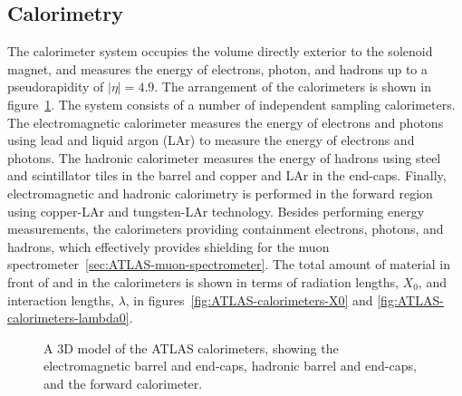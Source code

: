 \subsection{Calorimetry}\label{sec:ATLAS-calorimeters}
The calorimeter system occupies the volume directly exterior to the solenoid magnet, and measures the energy of electrons, photon, and hadrons up to a pseudorapidity of $|\eta|=4.9$. The arrangement of the calorimeters is shown in figure~\ref{fig:ATLAS-calorimeters}. The system consists of a number of independent sampling calorimeters. The electromagnetic calorimeter measures the energy of electrons and photons using lead and liquid argon (LAr) to measure the energy of electrons and photons. The hadronic calorimeter measures the energy of hadrons using steel and scintillator tiles in the barrel and copper and LAr in the end-caps. Finally, electromagnetic and hadronic calorimetry is performed in the forward region using copper-LAr and tungsten-LAr technology. Besides performing energy measurements, the calorimeters providing containment electrons, photons, and hadrons, which effectively provides shielding for the muon spectrometer~\ref{sec:ATLAS-muon-spectrometer}. The total amount of material in front of and in the calorimeters is shown in terms of radiation lengths, $X_0$, and interaction lengths, $\lambda$, in figures~\ref{fig:ATLAS-calorimeters-X0} and \ref{fig:ATLAS-calorimeters-lambda0}.

\begin{figure}[htbp]
	\centering
	\caption{A 3D model of the ATLAS calorimeters, showing the electromagnetic barrel and end-caps, hadronic barrel and end-caps, and the forward calorimeter.}
	\label{fig:ATLAS-calorimeters}
\end{figure}


